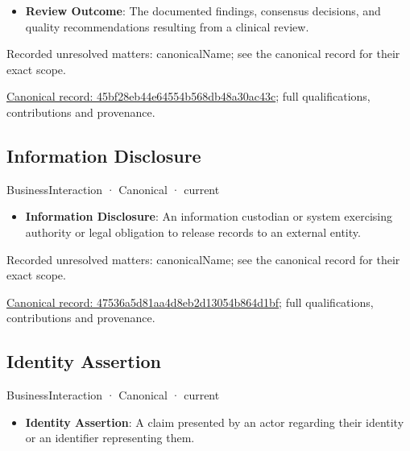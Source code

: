 \begin{itemize}


\item \textbf{Review Outcome}: The documented findings, consensus decisions, and quality recommendations resulting from a clinical review.

\end{itemize}

{\small Recorded unresolved matters: canonicalName; see the canonical record for their exact scope.}\par
{\footnotesize \href{../../../../continuum/business/business-interaction/45bf28eb44e64554b568db48a30ac43c.md}{Canonical record: 45bf28eb44e64554b568db48a30ac43c}; full qualifications, contributions and provenance.}\par
\subsection{Information Disclosure}

\label{element:47536a5d81aa4d8eb2d13054b864d1bf}
{\small BusinessInteraction · Canonical · current}\par

\begin{itemize}


\item \textbf{Information Disclosure}: An information custodian or system exercising authority or legal obligation to release records to an external entity.

\end{itemize}

{\small Recorded unresolved matters: canonicalName; see the canonical record for their exact scope.}\par
{\footnotesize \href{../../../../continuum/business/business-interaction/47536a5d81aa4d8eb2d13054b864d1bf.md}{Canonical record: 47536a5d81aa4d8eb2d13054b864d1bf}; full qualifications, contributions and provenance.}\par
\subsection{Identity Assertion}

\label{element:47b9abea0964451eb0fa419b464b4505}
{\small BusinessInteraction · Canonical · current}\par

\begin{itemize}


\item \textbf{Identity Assertion}: A claim presented by an actor regarding their identity or an identifier representing them.

\end{itemize}

